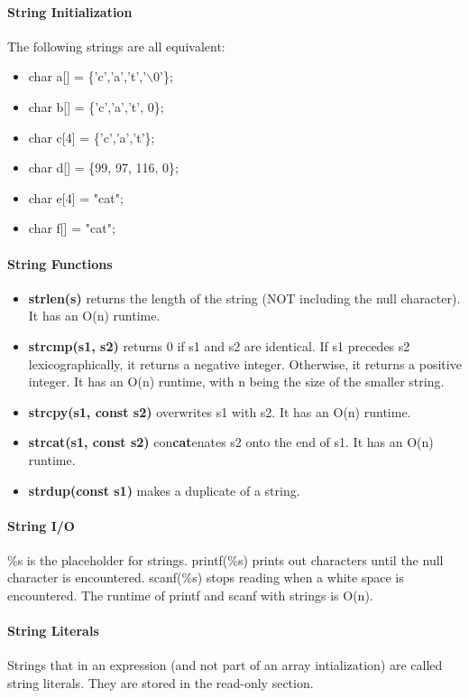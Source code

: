 \documentclass[10pt,letter]{article}
\begin{document}
\paragraph{String Initialization} The following strings are all equivalent: 
\begin{itemize}
    \item char a[] = \{'c','a','t','$\backslash$0'\};
    \item char b[] = \{'c','a','t', 0\};
    \item char c[4] = \{'c','a','t'\};
    \item char d[] = \{99, 97, 116, 0\};
    \item char e[4] = "cat";
    \item char f[] = "cat";
\end{itemize}

\paragraph{String Functions}
\begin{itemize}
    \item \textbf{strlen(s)} returns the length of the string (NOT including the null character). It has an O(n) runtime.
    \item \textbf{strcmp(s1, s2)} returns 0 if s1 and s2 are identical. If s1 precedes s2 lexicographically, it returns a negative integer. Otherwise, it returns a positive integer. It has an O(n) runtime, with n being the size of the smaller string.
    \item \textbf{strcpy(s1, const s2)} overwrites s1 with s2. It has an O(n) runtime.
    \item \textbf{strcat(s1, const s2)} con\textbf{cat}enates s2 onto the end of s1. It has an O(n) runtime.
    \item \textbf{strdup(const s1)} makes a duplicate of a string. 
\end{itemize}

\paragraph{String I/O} \%s is the placeholder for strings. printf(\%s) prints out characters until the null character is encountered. scanf(\%s) stops reading when a white space is encountered. The runtime of printf and scanf with strings is O(n).

\paragraph{String Literals} Strings that in an expression (and not part of an array intialization) are called string literals. They are stored in the read-only section.
\end{document}

